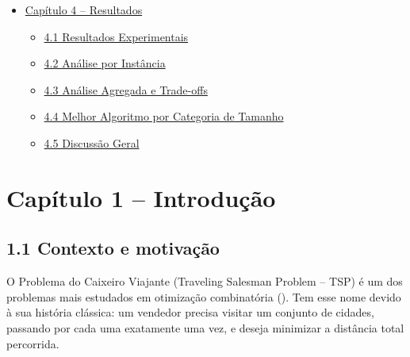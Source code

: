 \begin{itemize}
\begin{itemize}
    \begin{itemize}
    \tightlist
    \item
      \hyperref[sec-321-ga-base]{3.2.1 O Algoritmo Genético Base (GA +
      2-opt)}
    \item
      \hyperref[sec-322-variantes]{3.2.2 Estratégias de Paralelização
      (As 4 Variantes)}
    \end{itemize}
  \item
    \hyperref[sec-33-selecao-instancias]{3.3 Seleção de instâncias e
    protocolo experimental}
  \item
    \hyperref[sec-34-protocolo-estatistico]{3.4 Protocolo de análise
    estatística}
  \end{itemize}
\item
  \hyperref[cap4-resultados]{Capítulo 4 -- Resultados}

  \begin{itemize}
  \tightlist
  \item
    \hyperref[sec-41-resultados-experimentais]{4.1 Resultados
    Experimentais}
  \item
    \hyperref[sec-42-analise-por-instancia]{4.2 Análise por Instância}
  \item
    \hyperref[sec-43-analise-agregada]{4.3 Análise Agregada e
    Trade-offs}
  \item
    \hyperref[sec-44-melhor-algoritmo]{4.4 Melhor Algoritmo por
    Categoria de Tamanho}
  \item
    \hyperref[sec-45-discussao-geral]{4.5 Discussão Geral}
  \end{itemize}
\end{itemize}

\section{Capítulo 1 -- Introdução}\label{cap1-introducao}

\subsection{1.1 Contexto e motivação}\label{sec-11-contexto-e-motivacao}

O Problema do Caixeiro Viajante (Traveling Salesman Problem -- TSP) é um
dos problemas mais estudados em otimização combinatória
(). Tem esse nome devido à sua história
clássica: um vendedor precisa visitar um conjunto de cidades, passando
por cada uma exatamente uma vez, e deseja minimizar a distância total
percorrida.

